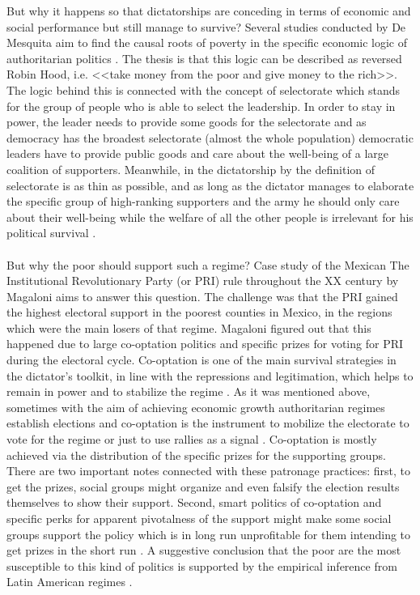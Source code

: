 \documentclass[a4paper, 12pt]{article}
\begin{document}
    But why it happens so that dictatorships are conceding in terms of economic and social performance but still manage to survive? Several studies conducted by De Mesquita aim to find the causal roots of poverty in the specific economic logic of authoritarian politics \parencite{political_roots}. The thesis is that this logic can be described as reversed Robin Hood, i.e. <<take money from the poor and give money to the rich>>. The logic behind this is connected with the concept of selectorate which stands for the group of people who is able to select the leadership. In order to stay in power, the leader needs to provide some goods for the selectorate and as democracy has the broadest selectorate (almost the whole population) democratic leaders have to provide public goods and care about the well-being of a large coalition of supporters. Meanwhile, in the dictatorship by the definition of selectorate is as thin as possible, and as long as the dictator manages to elaborate the specific group of high-ranking supporters and the army he should only care about their well-being while the welfare of all the other people is irrelevant for his political survival \parencite{handbook}.
    \\\\
    But why the poor should support such a regime? Case study of the Mexican The Institutional Revolutionary Party (or PRI) rule throughout the XX century by Magaloni \parencite{voting_for_autocracy} aims to answer this question. The challenge was that the PRI gained the highest electoral support in the poorest counties in Mexico, in the regions which were the main losers of that regime. Magaloni figured out that this happened due to large co-optation politics and specific prizes for voting for PRI during the electoral cycle. Co-optation is one of the main survival strategies in the dictator's toolkit, in line with the repressions and legitimation, which helps to remain in power and to stabilize the regime \parencite{three_pilars, toolkit}. As it was mentioned above, sometimes with the aim of achieving economic growth authoritarian regimes establish elections and co-optation is the instrument to mobilize the electorate to vote for the regime or just to use rallies as a signal \parencite{regional_roots, mobilization}. Co-optation is mostly achieved via the distribution of the specific prizes for the supporting groups. There are two important notes connected with these patronage practices: first, to get the prizes, social groups might organize and even falsify the election results themselves \parencite{more_than_win} to show their support. Second, smart politics of co-optation and specific perks for apparent pivotalness of the support might make some social groups support the policy which is in long run unprofitable for them intending to get prizes in the short run \parencite{prizes}. A suggestive conclusion that the poor are the most susceptible to this kind of politics is supported by the empirical inference from Latin American regimes \parencite{patronage}.
	
\end{document}
